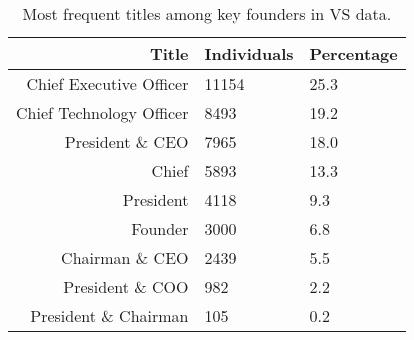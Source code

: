 \begin{table}[]
\centering
\begingroup\normalsize
\begin{tabular}{rll}
  \toprule
Title & Individuals & Percentage \\ 
  \midrule
Chief Executive Officer & 11154 & 25.3 \\ 
  Chief Technology Officer & 8493 & 19.2 \\ 
  President \& CEO & 7965 & 18.0 \\ 
  Chief & 5893 & 13.3 \\ 
  President & 4118 & 9.3 \\ 
  Founder & 3000 & 6.8 \\ 
  Chairman \& CEO & 2439 & 5.5 \\ 
  President \& COO & 982 & 2.2 \\ 
  President \& Chairman & 105 & 0.2 \\ 
   \bottomrule
\end{tabular}
\endgroup
\caption{Most frequent titles among key founders in VS data.} 
\label{table:VS_founder2_titlesSummaryTable}
\end{table}
